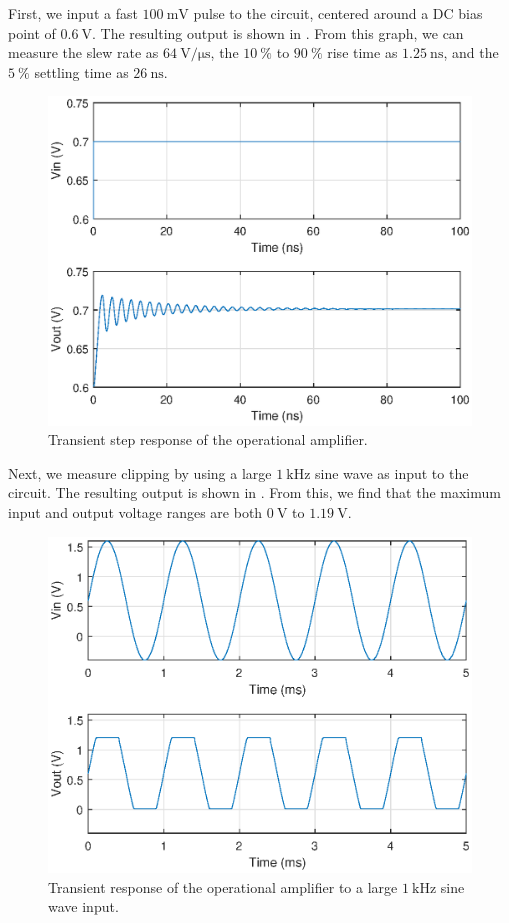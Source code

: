 \documentclass[journal,hidelinks]{IEEEtran}
\begin{document}
First, we input a fast $\SI{100}{\milli\volt}$ pulse to the circuit, centered around a DC bias point of $\SI{0.6}{\volt}$. The resulting output is shown in . From this graph, we can measure the slew rate as $\SI{64}{\volt\per\micro\second}$, the $\SI{10}{\percent}$ to $\SI{90}{\percent}$ rise time as $\SI{1.25}{\nano\second}$, and the $\SI{5}{\percent}$ settling time as $\SI{26}{\nano\second}$.

\begin{figure}[!htb]
  \centering
  \includegraphics[width=\columnwidth]{tran_step.eps}
  \caption{Transient step response of the operational amplifier.}
  \label{fig:tran_step}
\end{figure}

Next, we measure clipping by using a large $\SI{1}{\kilo\hertz}$ sine wave as input to the circuit. The resulting output is shown in . From this, we find that the maximum input and output voltage ranges are both $\SI{0}{\volt}$ to $\SI{1.19}{\volt}$.

\begin{figure}[!htb]
  \centering
  \includegraphics[width=\columnwidth]{tran_clip.eps}
  \caption{Transient response of the operational amplifier to a large $\SI{1}{\kilo\hertz}$ sine wave input.}
  \label{fig:tran_clip}
\end{figure}
\end{document}
